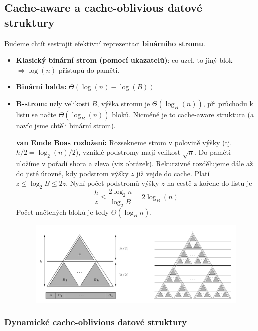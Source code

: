 \documentclass[11pt]{report} %
\numberwithin{equation}{section}
\begin{document}
\subsection{Cache-aware a cache-oblivious datové struktury}
Budeme chtít sestrojit efektivní reprezentaci \textbf{binárního stromu}.
\begin{itemize}
\item \textbf{Klasický binární strom (pomocí ukazatelů)}: co uzel, to jiný blok $\Rightarrow \log (n)$ přístupů do paměti.

\item \textbf{Binární halda:} $\Theta(\log(n) - \log(B))$

\item \textbf{B-strom:} uzly velikosti $B$, výška stromu je $\Theta(\log_B(n))$, při průchodu k listu se načte $\Theta(\log_B(n))$ bloků. Nicméně je to cache-aware struktura (a navíc jsme chtěli binární strom).

\textbf{van Emde Boas rozložení:} Rozsekneme strom v polovině výšky (tj. $h/2 = \log_2(n)/2$), vzniklé podstromy mají velikost $\sqrt{n}$. Do paměti uložíme v pořadí shora a zleva (viz obrázek). Rekurzivně rozdělujeme dále až do jisté úrovně, kdy podstrom výšky $z$ již vejde do cache. Platí $z \leq \log_2 B \leq 2z$.  Nyní počet podstromů výšky $z$ na cestě z kořene do listu je $$\frac{h}{z} \leq \frac{2\log_2 n}{\log_2 B} = 2\log_B(n)$$
Počet načtených bloků je tedy $\Theta(\log_B n)$.

\begin{figure}[H]
	\centering
	\includegraphics[]{img/vanemdeboas.png}
\end{figure}
	
\end{itemize}

\subsubsection{Dynamické cache-oblivious datové struktury}
\end{document}
